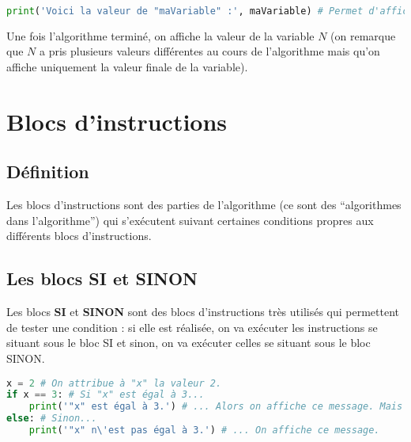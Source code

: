 	\begin{formula}[En python]
		\entretitreetliste
\begin{lstlisting}[language=python]
print('Voici la valeur de "maVariable" :', maVariable) # Permet d'afficher la valeur de "maVariable".
\end{lstlisting}
	\end{formula}
	
	\begin{tip}
		Une fois l'algorithme terminé, on affiche la valeur de la variable $N$ (on remarque que $N$ a pris plusieurs valeurs différentes au cours de l'algorithme mais qu'on affiche uniquement la valeur finale de la variable).
	\end{tip}
	
	\section{Blocs d'instructions}
	
	\subsection{Définition}
	
	Les blocs d'instructions sont des parties de l'algorithme (ce sont des ``algorithmes dans l'algorithme'') qui s'exécutent suivant certaines conditions propres aux différents blocs d'instructions.
	
	\subsection{Les blocs SI et SINON}
	
	Les blocs \textbf{SI} et \textbf{SINON} sont des blocs d'instructions très utilisés qui permettent de tester une condition : si elle est réalisée, on va exécuter les instructions se situant sous le bloc SI et sinon, on va exécuter celles se situant sous le bloc SINON.
	
	\begin{formula}[En python]
		\entretitreetliste
\begin{lstlisting}[language=python]
x = 2 # On attribue à "x" la valeur 2.
if x == 3: # Si "x" est égal à 3...
	print('"x" est égal à 3.') # ... Alors on affiche ce message. Mais ici, "x" vaut 2 donc ce message ne sera jamais affiché.
else: # Sinon...
	print('"x" n\'est pas égal à 3.') # ... On affiche ce message.
\end{lstlisting}
	\end{formula}
	
